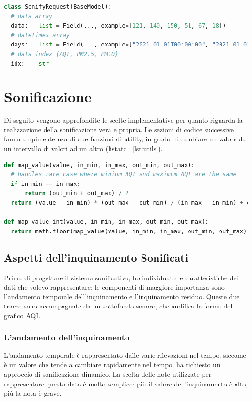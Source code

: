 \begin{lstlisting}[language=Python,caption={La funzione che gestisce la richiesta /sonify.},label={lst:sonify}]
class SonifyRequest(BaseModel):
  # data array
  data:   list = Field(..., example=[121, 140, 150, 51, 67, 18])
  # dateTimes array
  days:   list = Field(..., example=["2021-01-01T00:00:00", "2021-01-01T00:00:01"])
  # data index (AQI, PM2.5, PM10)
  idx:    str 
\end{lstlisting}



\section{Sonificazione}
Di seguito vengono approfondite le scelte implementative per quanto riguarda la realizzazione della sonificazione vera e propria.
Le sezioni di codice successive fanno ampimente uso di due funzioni di utility, in grado di cambiare un valore da un intervallo di valori ad un altro (listato ~\ref{lst:utils}).

\begin{lstlisting}[language=Python,caption={Funzioni utility.},label={lst:utils}]
def map_value(value, in_min, in_max, out_min, out_max):
  # handles rare case where minium AQI and maximum AQI are the same
  if in_min == in_max:
      return (out_min + out_max) / 2
  return (value - in_min) * (out_max - out_min) / (in_max - in_min) + out_min

def map_value_int(value, in_min, in_max, out_min, out_max):
  return math.floor(map_value(value, in_min, in_max, out_min, out_max))
\end{lstlisting}



\subsection{Aspetti dell'inquinamento Sonificati}
Prima di progettare il sistema sonificativo, ho individuato le caratteristiche dei dati che volevo rappresentare:
le componenti di maggiore importanza sono l’andamento temporale dell'inquinamento e l'inquinamento residuo.
Queste due tracce sono accompagnate da un sottofondo sonoro, che audifica la forma del grafico AQI.
\subsubsection{L'andamento dell'inquinamento}
L'andamento temporale è rappresentato dalle varie rilevazioni nel tempo, siccome è un valore che tende a cambiare rapidamente nel tempo, ha richiesto un approccio di sonificazione dinamico.
La scelta delle note utilizzate per rappresentare questo dato è molto semplice: più il valore dell'inquinamento è alto, più la nota è grave.
